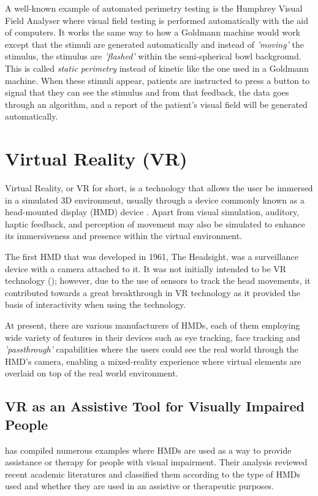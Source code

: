 \documentclass{l4proj}
\begin{document}
A well-known example of automated perimetry testing is the Humphrey Visual Field Analyser where visual field testing is performed automatically with the aid of computers. It works the same way to how a Goldmann machine would work except that the stimuli are generated automatically and instead of \textit{'moving'} the stimulus, the stimulus are \textit{'flashed'} within the semi-spherical bowl background. This is called \textit{static perimetry} instead of kinetic like the one used in a Goldmann machine. When these stimuli appear, patients are instructed to press a button to signal that they can see the stimulus and from that feedback, the data goes through an algorithm, and a report of the patient's visual field will be generated automatically.

\section{Virtual Reality (VR)}
Virtual Reality, or VR for short, is a technology that allows the user be immersed in a simulated 3D environment, usually through a device commonly known as a head-mounted display (HMD) device \cite{Berkman2024HistoryReality}. Apart from visual simulation, auditory, haptic feedback, and perception of movement may also be simulated to enhance its immersiveness and presence within the virtual environment. 

The first HMD that was developed in 1961, The Headsight, was a surveillance device with a camera attached to it. It was not initially intended to be VR technology (\cite{Bown2017LookingReality}); however, due to the use of sensors to track the head movements, it contributed towards a great breakthrough in VR technology as it provided the basis of interactivity when using the technology.

At present, there are various manufacturers of HMDs, each of them employing wide variety of features in their devices such as eye tracking, face tracking and \textit{'passthrough'} capabilities where the users could see the real world through the HMD's camera, enabling a mixed-reality experience where virtual elements are overlaid on top of the real world environment.

\subsection{VR as an Assistive Tool for Visually Impaired People}
\cite{Li2022AImpaired} has compiled numerous examples where HMDs are used as a way to provide assistance or therapy for people with visual impairment. Their analysis reviewed recent academic literatures and classified them according to the type of HMDs used and whether they are used in an assistive or therapeutic purposes. 
\end{document}
